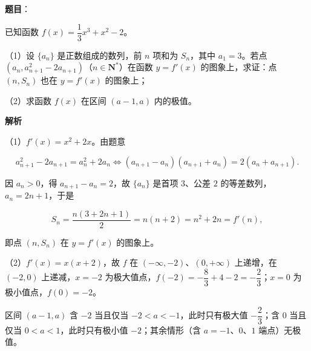 \begin{answer}

\textbf{题目}：

已知函数 $f(x)=\dfrac13x^3+x^2-2$。

（1）设 $\{a_n\}$ 是正数组成的数列，前 $n$ 项和为 $S_n$，其中 $a_1=3$。若点 $(a_n,a_{n+1}^2-2a_{n+1})$（$n\in\mathbf N^*$）在函数 $y=f'(x)$ 的图象上，求证：点 $(n,S_n)$ 也在 $y=f'(x)$ 的图象上；

（2）求函数 $f(x)$ 在区间 $(a-1,a)$ 内的极值。

\textbf{解析}

（1）$f'(x)=x^2+2x$。由题意

\nopagebreak[4]
\[a_{n+1}^2-2a_{n+1}=a_n^2+2a_n\iff (a_{n+1}-a_n)(a_{n+1}+a_n)=2(a_n+a_{n+1}).\]

因 $a_n>0$，得 $a_{n+1}-a_n=2$，故 $\{a_n\}$ 是首项 $3$、公差 $2$ 的等差数列，$a_n=2n+1$，于是

\nopagebreak[4]
\[S_n=\frac{n(3+2n+1)}2=n(n+2)=n^2+2n=f'(n),\]

即点 $(n,S_n)$ 在 $y=f'(x)$ 的图象上。

（2）$f'(x)=x(x+2)$，故 $f$ 在 $(-\infty,-2)$、$(0,+\infty)$ 上递增，在 $(-2,0)$ 上递减，$x=-2$ 为极大值点，$f(-2)=-\dfrac83+4-2=-\dfrac23$；$x=0$ 为极小值点，$f(0)=-2$。

区间 $(a-1,a)$ 含 $-2$ 当且仅当 $-2<a<-1$，此时只有极大值 $-\dfrac23$；含 $0$ 当且仅当 $0<a<1$，此时只有极小值 $-2$；其余情形（含 $a=-1$、$0$、$1$ 端点）无极值。


\end{answer}
